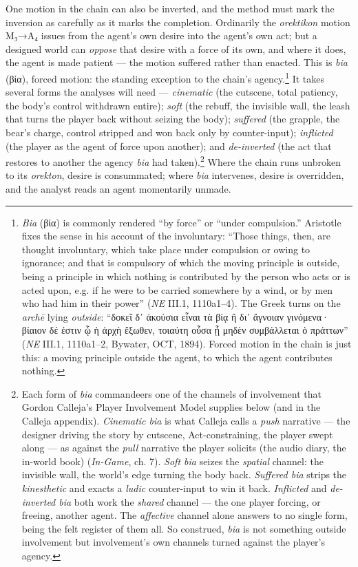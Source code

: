 \documentclass{article}
\newcommand{\gk}[1]{{\greekfont #1}}
\begin{document}
One motion in the chain can also be inverted, and the method must mark the inversion as carefully as it marks the completion. Ordinarily the \textit{orektikon} motion M₃→A₄ issues from the agent's own desire into the agent's own act; but a designed world can \textit{oppose} that desire with a force of its own, and where it does, the agent is made patient — the motion suffered rather than enacted. This is \textit{bia} (\gk{βία}), forced motion: the standing exception to the chain's agency.\footnote{\textit{Bia} (\gk{βία}) is commonly rendered ``by force'' or ``under compulsion.'' Aristotle fixes the sense in his account of the involuntary: ``Those things, then, are thought involuntary, which take place under compulsion or owing to ignorance; and that is compulsory of which the moving principle is outside, being a principle in which nothing is contributed by the person who acts or is acted upon, e.g. if he were to be carried somewhere by a wind, or by men who had him in their power'' (\textit{NE} III.1, 1110a1–4). The Greek turns on the \textit{archē} lying \textit{outside}: ``\gk{δοκεῖ δ᾽ ἀκούσια εἶναι τὰ βίᾳ ἢ δι᾽ ἄγνοιαν γινόμενα· βίαιον δέ ἐστιν ᾧ ἡ ἀρχὴ ἔξωθεν, τοιαύτη οὖσα ᾗ μηδὲν συμβάλλεται ὁ πράττων}'' (\textit{NE} III.1, 1110a1–2, Bywater, OCT, 1894). Forced motion in the chain is just this: a moving principle outside the agent, to which the agent contributes nothing.} It takes several forms the analyses will need — \textit{cinematic} (the cutscene, total patiency, the body's control withdrawn entire); \textit{soft} (the rebuff, the invisible wall, the leash that turns the player back without seizing the body); \textit{suffered} (the grapple, the bear's charge, control stripped and won back only by counter-input); \textit{inflicted} (the player as the agent of force upon another); and \textit{de-inverted} (the act that restores to another the agency \textit{bia} had taken).\footnote{Each form of \textit{bia} commandeers one of the channels of involvement that Gordon Calleja's Player Involvement Model supplies below (and in the Calleja appendix). \textit{Cinematic bia} is what Calleja calls a \textit{push} narrative — the designer driving the story by cutscene, Act-constraining, the player swept along — as against the \textit{pull} narrative the player solicits (the audio diary, the in-world book) (\textit{In-Game}, ch. 7). \textit{Soft bia} seizes the \textit{spatial} channel: the invisible wall, the world's edge turning the body back. \textit{Suffered bia} strips the \textit{kinesthetic} and exacts a \textit{ludic} counter-input to win it back. \textit{Inflicted} and \textit{de-inverted bia} both work the \textit{shared} channel — the one player forcing, or freeing, another agent. The \textit{affective} channel alone answers to no single form, being the felt register of them all. So construed, \textit{bia} is not something outside involvement but involvement's own channels turned against the player's agency.} Where the chain runs unbroken to its \textit{orekton}, desire is consummated; where \textit{bia} intervenes, desire is overridden, and the analyst reads an agent momentarily unmade.
\end{document}
